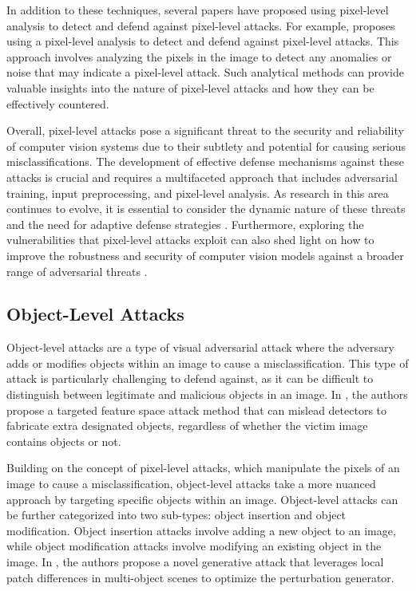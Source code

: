 \documentclass[11pt]{article}
\begin{document}
In addition to these techniques, several papers have proposed using pixel-level analysis to detect and defend against pixel-level attacks. For example, \cite{ref65} proposes using a pixel-level analysis to detect and defend against pixel-level attacks. This approach involves analyzing the pixels in the image to detect any anomalies or noise that may indicate a pixel-level attack. Such analytical methods can provide valuable insights into the nature of pixel-level attacks and how they can be effectively countered.

Overall, pixel-level attacks pose a significant threat to the security and reliability of computer vision systems due to their subtlety and potential for causing serious misclassifications. The development of effective defense mechanisms against these attacks is crucial and requires a multifaceted approach that includes adversarial training, input preprocessing, and pixel-level analysis. As research in this area continues to evolve, it is essential to consider the dynamic nature of these threats and the need for adaptive defense strategies \cite{ref66}. Furthermore, exploring the vulnerabilities that pixel-level attacks exploit can also shed light on how to improve the robustness and security of computer vision models against a broader range of adversarial threats \cite{ref67}.

\subsection{Object-Level Attacks}

Object-level attacks are a type of visual adversarial attack where the adversary adds or modifies objects within an image to cause a misclassification. This type of attack is particularly challenging to defend against, as it can be difficult to distinguish between legitimate and malicious objects in an image. In \cite{ref68}, the authors propose a targeted feature space attack method that can mislead detectors to fabricate extra designated objects, regardless of whether the victim image contains objects or not.

Building on the concept of pixel-level attacks, which manipulate the pixels of an image to cause a misclassification, object-level attacks take a more nuanced approach by targeting specific objects within an image. Object-level attacks can be further categorized into two sub-types: object insertion and object modification. Object insertion attacks involve adding a new object to an image, while object modification attacks involve modifying an existing object in the image. In \cite{ref69}, the authors propose a novel generative attack that leverages local patch differences in multi-object scenes to optimize the perturbation generator.
\end{document}
